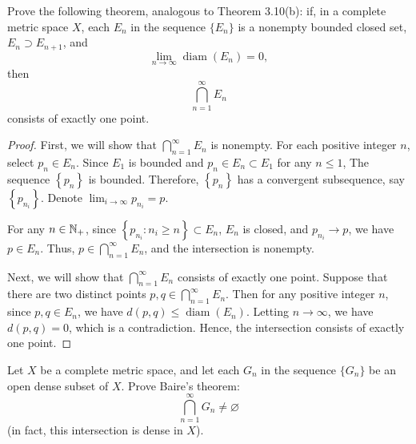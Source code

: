 \documentclass{article}
\begin{document}
\begin{problem}[3-21]
Prove the following theorem, analogous to Theorem 3.10(b): if, in a complete metric space $X$, each $E_n$ in the sequence $\{E_n\}$ is a nonempty bounded closed set, $E_n\supset E_{n+1}$, and
\[
\lim_{n\to\infty}\operatorname{diam}(E_n)=0,
\]
then
\[
\bigcap_{n=1}^{\infty}E_n
\]
consists of exactly one point.
\end{problem}

\begin{proof}
	First, we will show that \( \bigcap_{n=1}^{\infty} E_n \) is nonempty. For each positive integer \( n \), select \( p_n\in E_n \). Since \( E_1 \) is bounded and \( p_n\in E_n\subset E_1 \) for any \( n\le 1 \), The sequence \( \left\{p_n\right\} \) is bounded. Therefore, \( \left\{p_n\right\} \) has a convergent subsequence, say \( \left\{p_{n_i}\right\} \). Denote \( \lim_{i\to\infty}p_{n_i}=p \). \par
	For any \( n\in\mathbb{N}_+ \), since \( \left\{p_{n_i}:n_i\ge n\right\} \subset E_n \), \( E_n \) is closed, and \( p_{n_i}\to p \), we have \( p\in E_n \). Thus, \( p\in \bigcap_{n=1}^{\infty} E_n \), and the intersection is nonempty. \par
	Next, we will show that \( \bigcap_{n=1}^{\infty} E_n \) consists of exactly one point. Suppose that there are two distinct points \( p,q\in \bigcap_{n=1}^{\infty} E_n \). Then for any positive integer \( n \), since \( p,q\in E_n \), we have \( d(p,q)\le \operatorname{diam}(E_n) \). Letting \( n\to\infty \), we have \( d(p,q)=0 \), which is a contradiction. Hence, the intersection consists of exactly one point.
\end{proof}

\begin{problem}[3-22]
Let $X$ be a complete metric space, and let each $G_n$ in the sequence $\{G_n\}$ be an open dense subset of $X$. Prove Baire's theorem:
\[
\bigcap_{n=1}^{\infty} G_n \neq \varnothing
\]
(in fact, this intersection is dense in $X$).
\end{problem}
\end{document}
